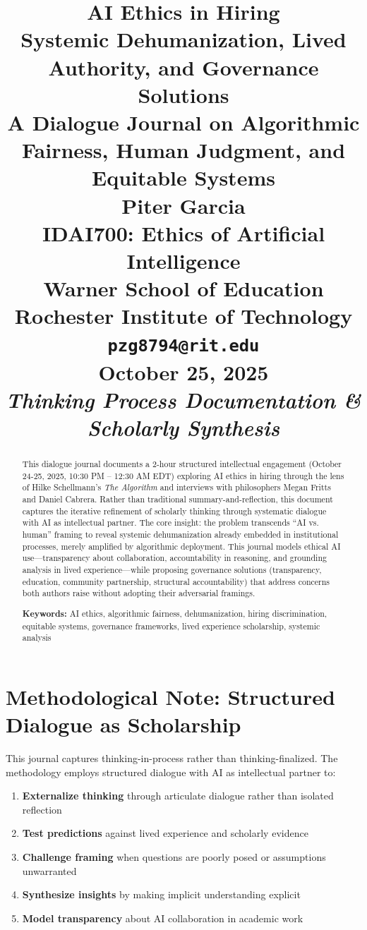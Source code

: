 \documentclass[11pt,twoside]{article}
\title{
\vspace*{1.5in}
\textbf{\Huge AI Ethics in Hiring}\\[0.5em]
\Large Systemic Dehumanization, Lived Authority, and Governance Solutions\\[1.5em]
\large A Dialogue Journal on Algorithmic Fairness, Human Judgment, and Equitable Systems\\[2em]

\vfill
\Large \textbf{Piter Garcia}\\
\normalsize IDAI700: Ethics of Artificial Intelligence\\
Warner School of Education\\
Rochester Institute of Technology\\
\texttt{pzg8794@rit.edu}\\[1em]

\large \textbf{October 25, 2025}\\
\normalsize \textit{Thinking Process Documentation \& Scholarly Synthesis}
}
\author{}
\date{}
\begin{document}
\thispagestyle{empty}
\maketitle
\newpage

\pagestyle{fancy}

\begin{abstract}
This dialogue journal documents a 2-hour structured intellectual engagement (October 24-25, 2025, 10:30 PM -- 12:30 AM EDT) exploring AI ethics in hiring through the lens of Hilke Schellmann's \textit{The Algorithm} and interviews with philosophers Megan Fritts and Daniel Cabrera. Rather than traditional summary-and-reflection, this document captures the iterative refinement of scholarly thinking through systematic dialogue with AI as intellectual partner. The core insight: the problem transcends ``AI vs. human'' framing to reveal systemic dehumanization already embedded in institutional processes, merely amplified by algorithmic deployment. This journal models ethical AI use---transparency about collaboration, accountability in reasoning, and grounding analysis in lived experience---while proposing governance solutions (transparency, education, community partnership, structural accountability) that address concerns both authors raise without adopting their adversarial framings.

\textbf{Keywords:} AI ethics, algorithmic fairness, dehumanization, hiring discrimination, equitable systems, governance frameworks, lived experience scholarship, systemic analysis
\end{abstract}

\vspace{0.5cm}

\section{Methodological Note: Structured Dialogue as Scholarship}

This journal captures thinking-in-process rather than thinking-finalized. The methodology employs structured dialogue with AI as intellectual partner to:

\begin{enumerate}
\item \textbf{Externalize thinking} through articulate dialogue rather than isolated reflection
\item \textbf{Test predictions} against lived experience and scholarly evidence
\item \textbf{Challenge framing} when questions are poorly posed or assumptions unwarranted
\item \textbf{Synthesize insights} by making implicit understanding explicit
\item \textbf{Model transparency} about AI collaboration in academic work
\end{enumerate}
\end{document}
